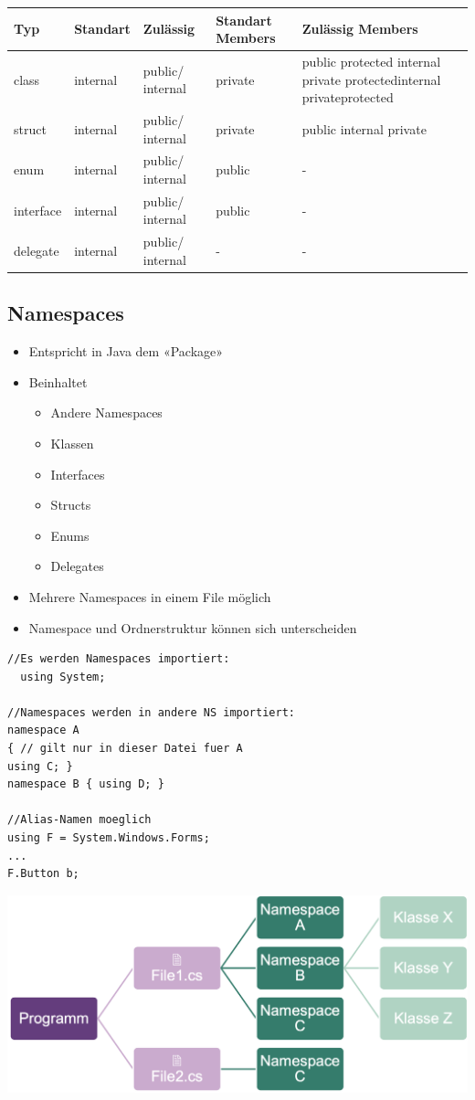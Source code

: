 \begin{tabular}{p{0.8cm} | p{0.8cm}| p{1cm}| p{0.8cm}| p{2.8cm}}
    Typ & Standart & Zulässig & Standart Members & Zulässig Members\\
    \hline
    class&internal&public/ internal&private& public protected internal private protectedinternal privateprotected\\
    struct&internal&public/ internal&private&public internal private\\
    enum&internal&public/ internal&public&-\\
    interface&internal&public/ internal&public&-\\
    delegate&internal&public/ internal&-&-\\
\end{tabular}

\subsection{Namespaces}

\begin{itemize}
    \item Entspricht in Java dem «Package»
    \item Beinhaltet
    \begin{itemize}
        \item Andere Namespaces
        \item Klassen
        \item Interfaces
        \item Structs
        \item Enums
        \item Delegates
    \end{itemize}
    \item Mehrere Namespaces in einem File möglich
    \item Namespace und Ordnerstruktur können sich unterscheiden
\end{itemize}
\begin{lstlisting}
//Es werden Namespaces importiert:
  using System;

//Namespaces werden in andere NS importiert:
namespace A
{ // gilt nur in dieser Datei fuer A
using C; }
namespace B { using D; }

//Alias-Namen moeglich
using F = System.Windows.Forms;
...
F.Button b;
\end{lstlisting}
\vspace{-10pt}
\begin{center}
\includegraphics[scale=.21]{graphic/cGrundlagen/CGrundlagen_Aufteilung in Dateien.png}
\end{center}
\vspace{-8pt}

